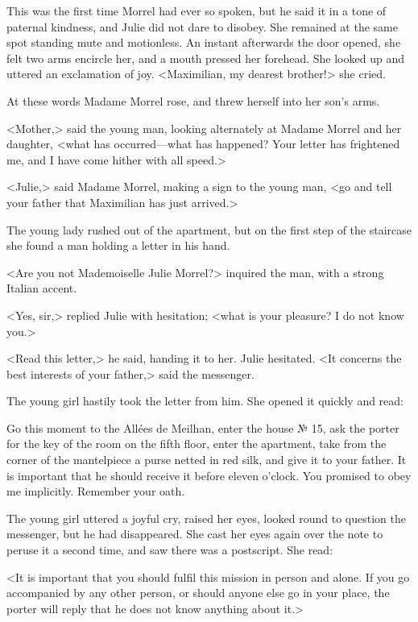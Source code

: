  This was the first time Morrel had ever so spoken, but he said it in a tone of paternal kindness, and Julie did not dare to disobey. She remained at the same spot standing mute and motionless. An instant afterwards the door opened, she felt two arms encircle her, and a mouth pressed her forehead. She looked up and uttered an exclamation of joy.  <Maximilian, my dearest brother!> she cried. 

 At these words Madame Morrel rose, and threw herself into her son's arms. 

 <Mother,> said the young man, looking alternately at Madame Morrel and her daughter, <what has occurred—what has happened? Your letter has frightened me, and I have come hither with all speed.> 

 <Julie,> said Madame Morrel, making a sign to the young man, <go and tell your father that Maximilian has just arrived.> 

 The young lady rushed out of the apartment, but on the first step of the staircase she found a man holding a letter in his hand. 

 <Are you not Mademoiselle Julie Morrel?> inquired the man, with a strong Italian accent. 

 <Yes, sir,> replied Julie with hesitation; <what is your pleasure? I do not know you.> 

 <Read this letter,> he said, handing it to her. Julie hesitated. <It concerns the best interests of your father,> said the messenger. 

 The young girl hastily took the letter from him. She opened it quickly and read: 

\begin{mail}{}{}
	Go this moment to the Allées de Meilhan, enter the house № 15, ask the porter for the key of the room on the fifth floor, enter the apartment, take from the corner of the mantelpiece a purse netted in red silk, and give it to your father. It is important that he should receive it before eleven o'clock. You promised to obey me implicitly. Remember your oath. 
\end{mail}

 The young girl uttered a joyful cry, raised her eyes, looked round to question the messenger, but he had disappeared. She cast her eyes again over the note to peruse it a second time, and saw there was a postscript. She read: 

 <It is important that you should fulfil this mission in person and alone. If you go accompanied by any other person, or should anyone else go in your place, the porter will reply that he does not know anything about it.> 

